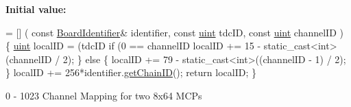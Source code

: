 {\bfseries Initial value\+:}
\begin{DoxyCode}
= [] (
    \textcolor{keyword}{const} \hyperlink{class_board_identifier}{BoardIdentifier}& identifier,
    \textcolor{keyword}{const} \hyperlink{_packet_8cpp_a69aa29b598b851b0640aa225a9e5d61d}{uint} tdcID,
    \textcolor{keyword}{const} \hyperlink{_packet_8cpp_a69aa29b598b851b0640aa225a9e5d61d}{uint} channelID
) \{
    \hyperlink{_packet_8cpp_a69aa29b598b851b0640aa225a9e5d61d}{uint} localID = (tdcID%
    \textcolor{keywordflow}{if} (0 == channelID%
        localID += 15 - \textcolor{keyword}{static\_cast<}\textcolor{keywordtype}{int}\textcolor{keyword}{>}(channelID / 2); 
    \} \textcolor{keywordflow}{else} \{
        localID += 79 - \textcolor{keyword}{static\_cast<}\textcolor{keywordtype}{int}\textcolor{keyword}{>}((channelID - 1) / 2); 
    \}
    localID += 256*identifier.\hyperlink{class_board_identifier_ad909f0c1eb9f80ec177ea8526c94d011}{getChainID}();
    \textcolor{keywordflow}{return} localID;
\}
\end{DoxyCode}


0 -\/ 1023 Channel Mapping for two 8x64 M\+C\+Ps 

